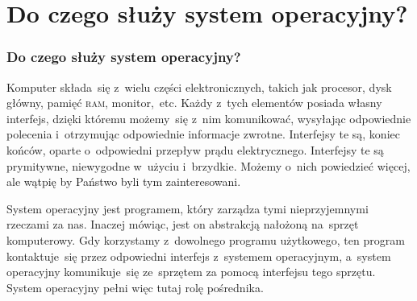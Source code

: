 \documentclass[10pt,t]{beamer}
\begin{document}
\section{Do czego służy system operacyjny?}


\begin{frame}
  \frametitle{Do czego służy system operacyjny?}


  Komputer składa~się z~wielu części elektronicznych, takich jak procesor,
  dysk główny, pamięć \textsc{ram}, monitor,~etc. Każdy z~tych elementów
  posiada własny interfejs, dzięki któremu możemy~się z~nim komunikować,
  wysyłając odpowiednie polecenia i~otrzymując odpowiednie informacje
  zwrotne. Interfejsy te są, koniec końców, oparte o~odpowiedni przepływ
  prądu elektrycznego. Interfejsy te są prymitywne, niewygodne w~użyciu
  i~brzydkie. Możemy o~nich powiedzieć więcej, ale wątpię by Państwo byli
  tym zainteresowani.

  System operacyjny jest programem, który zarządza tymi nieprzyjemnymi
  rzeczami za nas. Inaczej mówiąc, jest on abstrakcją nałożoną na~sprzęt
  komputerowy. Gdy korzystamy z~dowolnego programu użytkowego, ten program
  kontaktuje~się przez odpowiedni interfejs z~systemem operacyjnym,
  a~system operacyjny komunikuje~się ze~sprzętem za pomocą interfejsu tego
  sprzętu. System operacyjny pełni więc tutaj rolę pośrednika.

\end{frame}
\end{document}
